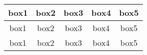 \documentclass{article}
\begin{document}
    \begin{center}
        \begin{tabular}{|c|c|c|c|c|}
            \hline
            box1 & box2 & box3 & box4 & box5\\
            \hline
            box1 & box2 & box3 & box4 & box5\\
            \hline
            box1 & box2 & box3 & box4 & box5\\
            \hline
        \end{tabular}
    \end{center}

\newpage
\end{document}
